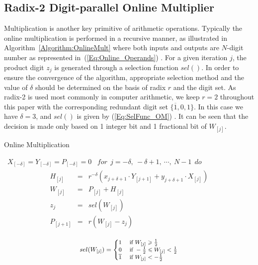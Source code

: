 \documentclass{acm_proc_article-sp}
\begin{document}
\subsection{Radix-2 Digit-parallel Online Multiplier}
Multiplication is another key primitive of arithmetic operations. Typically the online multiplication is performed in a recursive manner, as illustrated in Algorithm~\ref{Algorithm:OnlineMult} where both inputs and outputs are $N$-digit number as represented in~(\ref{Eq:Online_Operands}) \cite{Ercegovac_Book,Ercegovac_OnlineVLSI}. For a given iteration $j$, the product digit $z_j$ is generated through a selection function $sel()$. In order to ensure the convergence of the algorithm, appropriate selection method and the value of $\delta$ should be determined on the basis of radix $r$ and the digit set. As radix-2 is used most commonly in computer arithmetic, we keep $r=2$ throughout this paper with the corresponding redundant digit set $\{\overline{1},0,1\}$. In this case we have $\delta=3$, and $sel()$ is given by (\ref{Eq:SelFunc_OM}) \cite{Oregon_OnlineNetwork}. It can be seen that the decision is made only based on 1 integer bit and 1 fractional bit of $W_{[j]}$.
%
\begin{algorithm}[tbp]
  \caption{Online Multiplication}
  \begin{algorithmic}[1]
    \REQUIRE~$X_{[-\delta]}=Y_{[-\delta]}=P_{[-\delta]}=0$
    \ENSURE~$for~~ j=-\delta,~-\delta+1,~\cdots,~N-1 ~~do$
      \begin{eqnarray}\label{Eq:OnlineMult_General}
        \begin{matrix}
          H_{[j]}   & = & r^{-\delta}\left(x_{j+\delta+1}\cdot Y_{[j+1]}+y_{j+\delta+1}\cdot X_{[j]}\right)\\
          W_{[j]}   & = & P_{[j]} + H_{[j]}\\
          z_j       & = & sel(W_{[j]})\\
          P_{[j+1]} & = & r\left(W_{[j]}-z_j\right)
        \end{matrix}
      \end{eqnarray}
  \label{Algorithm:OnlineMult}
  \end{algorithmic}
\end{algorithm}
\vspace{-1ex}
%
\begin{eqnarray}\label{Eq:SelFunc_OM}
\small
  sel(W_{[j]})=\begin{cases}
    1 & \text{ if } W_{[j]} \geqslant \frac{1}{2} \\
    0 & \text{ if } -\frac{1}{2}\leqslant W_{[j]}<\frac{1}{2} \\
    \overline{1} & \text{ if } W_{[j]}<-\frac{1}{2}
  \end{cases}
\normalsize
\end{eqnarray}
\end{document}
